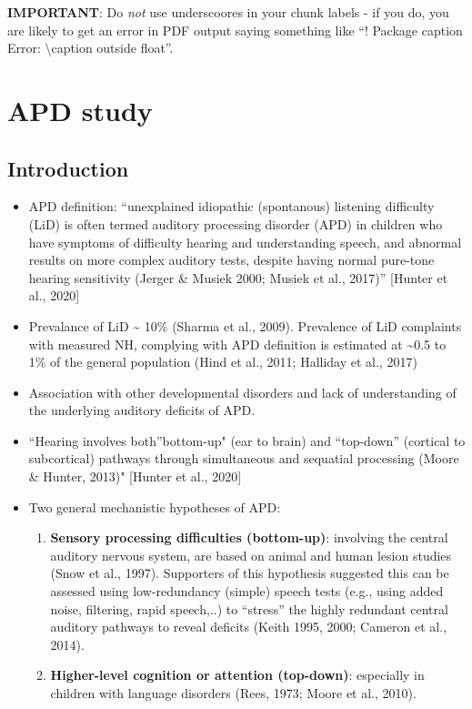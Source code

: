 \documentclass[a4paper, twoside]{templates/ociamthesis}
\providecommand{\tightlist}{%
  \setlength{\itemsep}{0pt}\setlength{\parskip}{0pt}}
\begin{document}
\textbf{IMPORTANT}: Do \emph{not} use underscoores in your chunk labels - if you do, you are likely to get an error in PDF output saying something like ``! Package caption Error: \textbackslash caption outside float''.

\hypertarget{APD-study}{%
\chapter{APD study}\label{APD-study}}


\minitoc 

\hypertarget{introduction-4}{%
\section{Introduction}\label{introduction-4}}

\begin{itemize}
\item
  APD definition: ``unexplained idiopathic (spontanous) listening difficulty (LiD) is often termed auditory processing disorder (APD) in children who have symptoms of difficulty hearing and understanding speech, and abnormal results on more complex auditory tests, despite having normal pure-tone hearing sensitivity (Jerger \& Musiek 2000; Musiek et al., 2017)'' {[}Hunter et al., 2020{]}
\item
  Prevalance of LiD \textasciitilde{} 10\% (Sharma et al., 2009). Prevalence of LiD complaints with measured NH, complying with APD definition is estimated at \textasciitilde0.5 to 1\% of the general population (Hind et al., 2011; Halliday et al., 2017)
\item
  Association with other developmental disorders and lack of understanding of the underlying auditory deficits of APD.
\item
  ``Hearing involves both''bottom-up" (ear to brain) and ``top-down'' (cortical to subcortical) pathways through simultaneous and sequatial processing (Moore \& Hunter, 2013)" {[}Hunter et al., 2020{]}
\item
  Two general mechanistic hypotheses of APD:

  \begin{enumerate}
  \def\labelenumi{(\arabic{enumi})}
  \tightlist
  \item
    \textbf{Sensory processing difficulties (bottom-up)}: involving the central auditory nervous system, are based on animal and human lesion studies (Snow et al., 1997). Supporters of this hypothesis suggested this can be assessed using low-redundancy (simple) speech tests (e.g., using added noise, filtering, rapid speech,..) to ``stress'' the highly redundant central auditory pathways to reveal deficits (Keith 1995, 2000; Cameron et al., 2014).
  \item
    \textbf{Higher-level cognition or attention (top-down)}: especially in children with language disorders (Rees, 1973; Moore et al., 2010).
  \end{enumerate}
\end{itemize}
\end{document}
